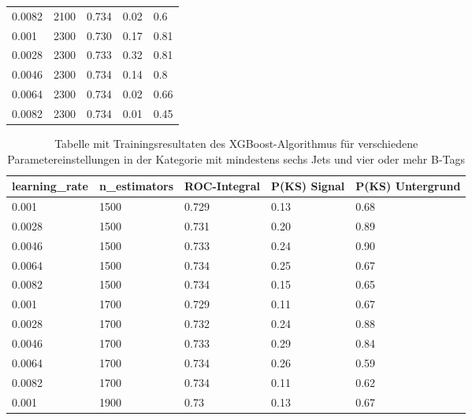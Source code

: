 \begin{table}[hhh]
\begin{center}
\begin{tabular}{lllll}
\num{0,0082} & \num{2100} & \num{0,734} & \num{0,02} & \num{0,6}\\
\num{0,001}  & \num{2300} & \num{0,730} & \num{0,17} & \num{0,81}\\
\num{0,0028} & \num{2300} & \num{0,733} & \num{0,32} & \num{0,81}\\
\num{0,0046} & \num{2300} & \num{0,734} & \num{0,14} & \num{0,8}\\
\num{0,0064} & \num{2300} & \num{0,734} & \num{0,02} & \num{0,66}\\
\num{0,0082} & \num{2300} & \num{0,734} & \num{0,01} & \num{0,45}\\
  \hline
  \end{tabular}
  \end{center}
\end{table}

\begin{table}[tbp]\parbox{12cm}{
\renewcommand\thetable{A.2}
  \caption[XGBoost 6j4t Ergebnisse]{Tabelle mit Trainingsresultaten des XGBoost-Algorithmus f\"ur verschiedene Parametereinstellungen in der Kategorie mit mindestens sechs Jets und vier oder mehr B-Tags}%
  }\label{tab:xgboost_6j4t}
  \begin{center}
  \begin{tabular}{lllll}
  \hline
  learning\_rate & n\_estimators & ROC-Integral & P(KS) Signal & P(KS) Untergrund\\
  \hline
\num{0,001}  & \num{1500} & \num{0,729} & \num{0,13} & \num{0,68}\\
\num{0,0028} & \num{1500} & \num{0,731} & \num{0,20} & \num{0,89}\\
\num{0,0046} & \num{1500} & \num{0,733} & \num{0,24} & \num{0,90}\\
\num{0,0064} & \num{1500} & \num{0,734} & \num{0,25} & \num{0,67}\\
\num{0,0082} & \num{1500} & \num{0,734} & \num{0,15} & \num{0,65}\\
\num{0,001}  & \num{1700} & \num{0,729} & \num{0,11} & \num{0,67}\\
\num{0,0028} & \num{1700} & \num{0,732} & \num{0,24} & \num{0,88}\\
\num{0,0046} & \num{1700} & \num{0,733} & \num{0,29} & \num{0,84}\\
\num{0,0064} & \num{1700} & \num{0,734} & \num{0,26} & \num{0,59}\\
\num{0,0082} & \num{1700} & \num{0,734} & \num{0,11} & \num{0,62}\\
\num{0,001}  & \num{1900} & \num{0,73}  & \num{0,13} & \num{0,67}\\

\end{tabular}
\end{center}
\end{table}
